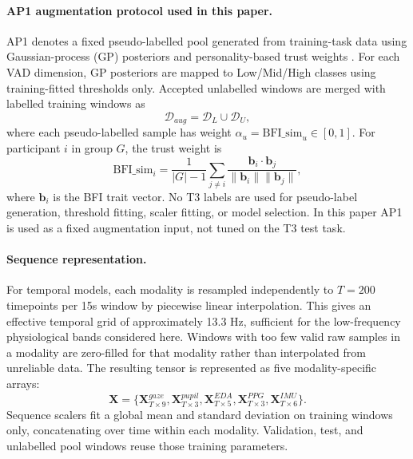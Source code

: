 \documentclass[sigconf,review,anonymous]{acmart}
\begin{document}
\paragraph{AP1 augmentation protocol used in this paper.}
AP1 denotes a fixed pseudo-labelled pool generated from training-task data
using Gaussian-process (GP) posteriors and personality-based trust weights
\cite{rasmussen2006gaussian,lee2013pseudo,john1999bigfive}.
For each VAD dimension, GP posteriors are mapped to Low/Mid/High classes using
training-fitted thresholds only.
Accepted unlabelled windows are merged with labelled training windows as
\begin{equation}
  \mathcal{D}_{aug}=\mathcal{D}_{L}\cup\mathcal{D}_{U},
\end{equation}
where each pseudo-labelled sample has weight
$\alpha_u=\mathrm{BFI\_sim}_u\in[0,1]$.
For participant $i$ in group $G$, the trust weight is
\begin{equation}
  \mathrm{BFI\_sim}_i=
  \frac{1}{|G|-1}\sum_{j\neq i}
  \frac{\mathbf{b}_i\cdot\mathbf{b}_j}{\|\mathbf{b}_i\|\|\mathbf{b}_j\|},
\end{equation}
where $\mathbf{b}_i$ is the BFI trait vector.
No T3 labels are used for pseudo-label generation, threshold fitting, scaler
fitting, or model selection.
In this paper AP1 is used as a fixed augmentation input, not tuned on the T3
test task.

\paragraph{Sequence representation.}
For temporal models, each modality is resampled independently to
$T=200$ timepoints per 15s window by piecewise linear interpolation.
This gives an effective temporal grid of approximately 13.3 Hz, sufficient for
the low-frequency physiological bands considered here.
Windows with too few valid raw samples in a modality are zero-filled for that
modality rather than interpolated from unreliable data.
The resulting tensor is represented as five modality-specific arrays:
\begin{equation}
  \mathbf{X} =
  \{\mathbf{X}^{gaze}_{T\times 9},
    \mathbf{X}^{pupil}_{T\times 3},
    \mathbf{X}^{EDA}_{T\times 5},
    \mathbf{X}^{PPG}_{T\times 3},
    \mathbf{X}^{IMU}_{T\times 6}\}.
\end{equation}
Sequence scalers fit a global mean and standard deviation on training windows
only, concatenating over time within each modality.
Validation, test, and unlabelled pool windows reuse those training parameters.
\end{document}
